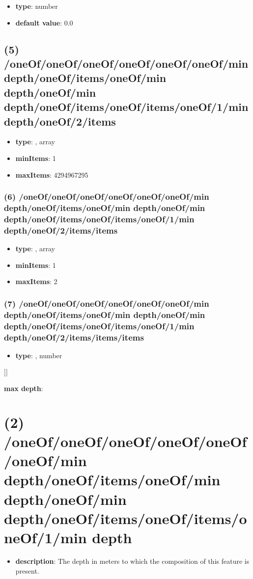 \begin{itemize}[leftmargin=6em]\item {\bf type}: number\item {\bf default value}: 0.0
\end{itemize}\subsection{(5) /oneOf/oneOf/oneOf/oneOf/oneOf/oneOf/min depth/oneOf/items/oneOf/min depth/oneOf/min depth/oneOf/items/oneOf/items/oneOf/1/min depth/oneOf/2/items}
\begin{itemize}[leftmargin=5em]\item {\bf type}: , array\item {\bf minItems}: 1
\item {\bf maxItems}: 4294967295
\end{itemize}\subsubsection{(6) /oneOf/oneOf/oneOf/oneOf/oneOf/oneOf/min depth/oneOf/items/oneOf/min depth/oneOf/min depth/oneOf/items/oneOf/items/oneOf/1/min depth/oneOf/2/items/items}
\begin{itemize}[leftmargin=6em]\item {\bf type}: , array\item {\bf minItems}: 1
\item {\bf maxItems}: 2
\end{itemize}\subsubsection{(7) /oneOf/oneOf/oneOf/oneOf/oneOf/oneOf/min depth/oneOf/items/oneOf/min depth/oneOf/min depth/oneOf/items/oneOf/items/oneOf/1/min depth/oneOf/2/items/items/items}
\begin{itemize}[leftmargin=7em]\item {\bf type}: , number\end{itemize}]]\item {\bf max depth}: \section{(2) /oneOf/oneOf/oneOf/oneOf/oneOf/oneOf/min depth/oneOf/items/oneOf/min depth/oneOf/min depth/oneOf/items/oneOf/items/oneOf/1/min depth}
\begin{itemize}[leftmargin=2em]\item {\bf description}: The depth in meters to which the composition of this feature is present.
\end{itemize}
